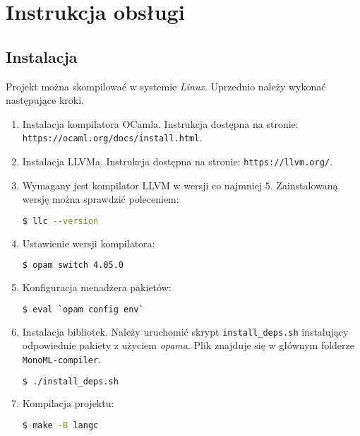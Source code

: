 \documentclass[declaration,shortabstract]{iithesis}
\begin{document}

\chapter{Instrukcja obsługi}

\section{Instalacja}

Projekt można skompilować w systemie \textit{Linux}.
Uprzednio należy wykonać następujące kroki. 

\begin{enumerate}
  \item Instalacja kompilatora OCamla. Instrukcja dostępna na stronie: \newline
  \texttt{https://ocaml.org/docs/install.html}.
  \item Instalacja LLVMa. Instrukcja dostępna na stronie: \newline
  \texttt{https://llvm.org/}.
  \item Wymagany jest kompilator LLVM w wersji co najmniej $5$. Zainstalowaną 
  wersję można sprawdzić poleceniem:
  \begin{lstlisting}[language=bash]
  $ llc --version
  \end{lstlisting}
  \item Ustawienie wersji kompilatora:
  \begin{lstlisting}[language=bash]
  $ opam switch 4.05.0
  \end{lstlisting}
  \item Konfiguracja menadżera pakietów:
  \begin{lstlisting}[language=bash]
  $ eval `opam config env`
  \end{lstlisting}
  \item Instalacja bibliotek. Należy uruchomić skrypt \texttt{install\_deps.sh}
   instalujący odpowiednie pakiety z użyciem \textit{opama}. Plik znajduje się 
   w głównym folderze 
  \texttt{MonoML-compiler}. 
  \begin{lstlisting}[language=bash]
  $ ./install_deps.sh
  \end{lstlisting}
  \item Kompilacja projektu:
  \begin{lstlisting}[language=bash]
  $ make -B langc
  \end{lstlisting}
\end{enumerate}
\end{document}
